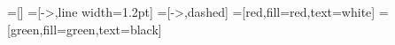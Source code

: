 \usepackage{tikz}
\usepackage{pgfplots}               %

\pgfplotsset{compat=1.18}          %
\usetikzlibrary{pgfplots.dateplot}  %

\usetikzlibrary{shapes}
\usetikzlibrary{graphs}            %
\usetikzlibrary{quotes}            %
\usetikzlibrary{positioning}       %

\tikzset{>=stealth}

=[] %
=[->,line width=1.2pt]
=[->,dashed] %
=[red,fill=red,text=white]
=[green,fill=green,text=black]
